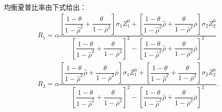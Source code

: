 \documentclass[10.0pt]{article}
\begin{document}
均衡夏普比率由下式给出：
\begin{eqnarray}
& R_1 = \alpha \dfrac{\left[ \dfrac{1 - \theta}{1 - {\hat \rho}^2} + \dfrac{\theta}{1 - \overline{\rho}^2} \right] \sigma_1 Z_1^0 + \left[ \dfrac{1 - \theta}{1 - {\hat \rho}^2} {\hat \rho} + \dfrac{\theta}{1 - \overline{\rho}^2} \overline{\rho} \right] \sigma_2 Z_2^0}{\left[ \dfrac{1 - \theta}{1 - {\hat \rho}^2} + \dfrac{\theta}{1 - \overline{\rho}^2} \right]^2 - \left[ \dfrac{1 - \theta}{1 - {\hat \rho}^2} {\hat \rho} + \dfrac{\theta}{1 - \overline{\rho}^2} \overline{\rho} \right]^2} & \\
& R_2 = \alpha \dfrac{\left[ \dfrac{1 - \theta}{1 - {\hat \rho}^2} {\hat \rho} + \dfrac{\theta}{1 - \overline{\rho}^2} \overline{\rho} \right] \sigma_1 Z_1^0 + \left[ \dfrac{1 - \theta}{1 - {\hat \rho}^2} + \dfrac{\theta}{1 - \overline{\rho}^2} \right] \sigma_2 Z_2^0}{\left[ \dfrac{1 - \theta}{1 - {\hat \rho}^2} + \dfrac{\theta}{1 - \overline{\rho}^2} \right]^2 - \left[ \dfrac{1 - \theta}{1 - {\hat \rho}^2} {\hat \rho} + \dfrac{\theta}{1 - \overline{\rho}^2} \overline{\rho} \right]^2}. &
\end{eqnarray}
\end{document}

